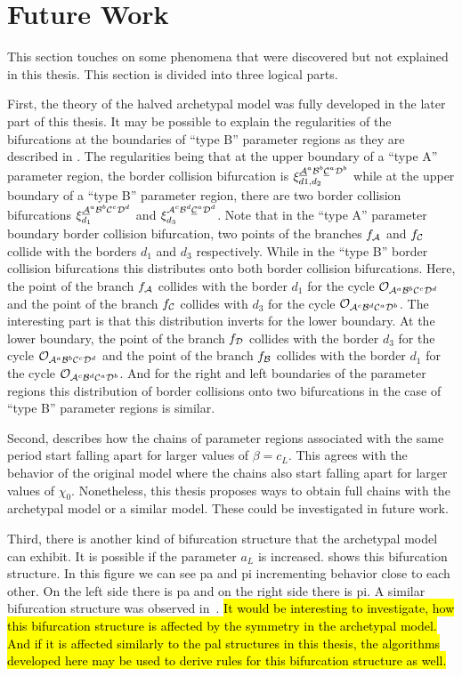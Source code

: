 \section{Future Work}
\label{sec:concl.future}

This section touches on some phenomena that were discovered but not explained in this thesis.
This section is divided into three logical parts.

First, the theory of the halved archetypal model was fully developed in the later part of this thesis.
It may be possible to explain the regularities of the bifurcations at the boundaries of ``type B'' parameter regions as they are described in .
The regularities being that at the upper boundary of a ``type A'' parameter region, the border collision bifurcation is $\xi_{d1, d_2}^{\underline{\mathcal{A}}^a\mathcal{B}^b\underline{\mathcal{C}}^a\mathcal{D}^b}$ while at the upper boundary of a ``type B'' parameter region, there are two border collision bifurcations $\xi_{d_1}^{\underline{\mathcal{A}}^a\mathcal{B}^b\mathcal{C}^c\mathcal{D}^d}$ and $\xi_{d_3}^{\mathcal{A}^c\mathcal{B}^d\underline{\mathcal{C}}^a\mathcal{D}^d}$.
Note that in the ``type A'' parameter boundary border collision bifurcation, two points of the branches $f_{\mathcal{A}}$ and $f_{\mathcal{C}}$ collide with the borders $d_1$ and $d_3$ respectively.
While in the ``type B'' border collision bifurcations this distributes onto both border collision bifurcations.
Here, the point of the branch $f_{\mathcal{A}}$ collides with the border $d_1$ for the cycle $\mathcal{O}_{\mathcal{A}^a\mathcal{B}^b\mathcal{C}^c\mathcal{D}^d}$ and the point of the branch $f_{\mathcal{C}}$ collides with $d_3$ for the cycle $\mathcal{O}_{\mathcal{A}^c\mathcal{B}^d\mathcal{C}^a\mathcal{D}^b}$.
The interesting part is that this distribution inverts for the lower boundary.
At the lower boundary, the point of the branch $f_{\mathcal{D}}$ collides with the border $d_3$ for the cycle $\mathcal{O}_{\mathcal{A}^a\mathcal{B}^b\mathcal{C}^c\mathcal{D}^d}$ and the point of the branch $f_{\mathcal{B}}$ collides with the border $d_1$ for the cycle $\mathcal{O}_{\mathcal{A}^c\mathcal{B}^d\mathcal{C}^a\mathcal{D}^b}$.
And for the right and left boundaries of the parameter regions this distribution of border collisions onto two bifurcations in the case of ``type B'' parameter regions is similar.

Second,  describes how the chains of parameter regions associated with the same period start falling apart for larger values of $\beta = c_L$.
This agrees with the behavior of the original model where the chains also start falling apart for larger values of $\chi_0$.
Nonetheless, this thesis proposes ways to obtain full chains with the archetypal model or a similar model.
These could be investigated in future work.

Third, there is another kind of bifurcation structure that the archetypal model can exhibit.
It is possible if the parameter $a_L$ is increased.
 shows this bifurcation structure.
In this figure we can see \gls{pa} and \gls{pi} incrementing behavior close to each other.
On the left side there is \gls{pa} and on the right side there is \gls{pi}.
A similar bifurcation structure was observed in~\cite{AvrSchBan06}.
\hl{
	It would be interesting to investigate, how this bifurcation structure is affected by the symmetry in the archetypal model.
	And if it is affected similarly to the \gls{pal} structures in this thesis, the algorithms developed here may be used to derive rules for this bifurcation structure as well.
}

